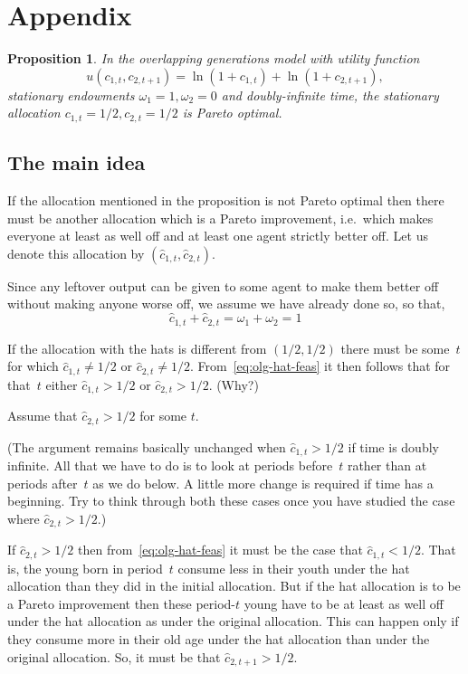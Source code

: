 \documentclass[11pt,reqno,openany]{amsbook}
\theoremstyle{plain}
\newtheorem{prop}{Proposition}[chapter]
\theoremstyle{definition}
\begin{document}
\section*{Appendix}
\begin{prop}
In the overlapping generations model with utility function
\[u(c_{1,t},c_{2,t+1})=\ln(1+c_{1,t})+\ln(1+c_{2,t+1}),\]
stationary endowments $\omega_1=1, \omega_2=0$ and doubly-infinite
time, the stationary allocation $c_{1,t}=1/2,c_{2,t}=1/2$ is Pareto
optimal.
\end{prop}

\subsection*{The main idea}
If the allocation mentioned in the proposition is not Pareto optimal then
there must be another allocation which is a Pareto improvement, i.e.\
which makes everyone at least as well off and at least one agent
strictly better off. Let us denote this allocation by $(\hat
c_{1,t},\hat c_{2,t})$. 

Since any leftover output can be given to some agent to make them
better off without making anyone worse off, we assume we have already
done so, so that,
\begin{equation}\label{eq:olg-hat-feas}
\hat c_{1,t}+\hat c_{2,t} = \omega_1+\omega_2 =1
\end{equation}

If the allocation with the hats is different from
$(1/2,1/2)$ there must be some~$t$ for which $\hat c_{1,t} \ne 1/2$ or
$\hat c_{2,t} \ne 1/2$. From~\eqref{eq:olg-hat-feas} it then follows
that for that~$t$ either $\hat c_{1,t}>1/2$ or $\hat c_{2,t}>1/2$. (Why?)

Assume that $\hat c_{2,t}>1/2$ for some $t$. 

(The argument remains basically unchanged when $\hat c_{1,t}>1/2$ if
time is doubly infinite. All that we have to do is to look at periods
before~$t$ rather than at periods after~$t$ as we do below. A little
more change is required if time has a beginning. Try to think through
both these cases once you have studied the case where $\hat
c_{2,t}>1/2$.)

If $\hat c_{2,t}>1/2$ then from~\eqref{eq:olg-hat-feas} it must be the
case that $\hat c_{1,t}<1/2$. That is, the young born in period~$t$
consume less in their youth under the hat allocation than they did in
the initial allocation. But if the hat allocation is to be a Pareto
improvement then these period-$t$ young have to be at least as well
off under the hat allocation as under the original allocation. This
can happen only if they consume more in their old age under the hat
allocation than under the original allocation. So, it must be that
$\hat c_{2,t+1}>1/2$.
\end{document}
